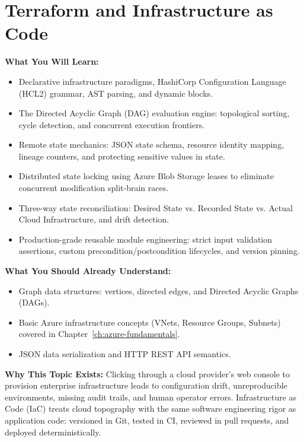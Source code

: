 \chapter{Terraform and Infrastructure as Code}
\label{ch:terraform-iac}

\begin{chaptergoalsbox}
\textbf{What You Will Learn:}
\begin{itemize}[leftmargin=12pt]
  \item Declarative infrastructure paradigms, HashiCorp Configuration Language (HCL2) grammar, AST parsing, and dynamic blocks.
  \item The Directed Acyclic Graph (DAG) evaluation engine: topological sorting, cycle detection, and concurrent execution frontiers.
  \item Remote state mechanics: JSON state schema, resource identity mapping, lineage counters, and protecting sensitive values in state.
  \item Distributed state locking using Azure Blob Storage leases to eliminate concurrent modification split-brain races.
  \item Three-way state reconciliation: Desired State vs. Recorded State vs. Actual Cloud Infrastructure, and drift detection.
  \item Production-grade reusable module engineering: strict input validation assertions, custom precondition/postcondition lifecycles, and version pinning.
\end{itemize}

\textbf{What You Should Already Understand:}
\begin{itemize}[leftmargin=12pt]
  \item Graph data structures: vertices, directed edges, and Directed Acyclic Graphs (DAGs).
  \item Basic Azure infrastructure concepts (VNets, Resource Groups, Subnets) covered in Chapter~\ref{ch:azure-fundamentals}.
  \item JSON data serialization and HTTP REST API semantics.
\end{itemize}

\textbf{Why This Topic Exists:}
Clicking through a cloud provider's web console to provision enterprise infrastructure leads to configuration drift, unreproducible environments, missing audit trails, and human operator errors. Infrastructure as Code (IaC) treats cloud topography with the same software engineering rigor as application code: versioned in Git, tested in CI, reviewed in pull requests, and deployed deterministically.


\end{chaptergoalsbox}
